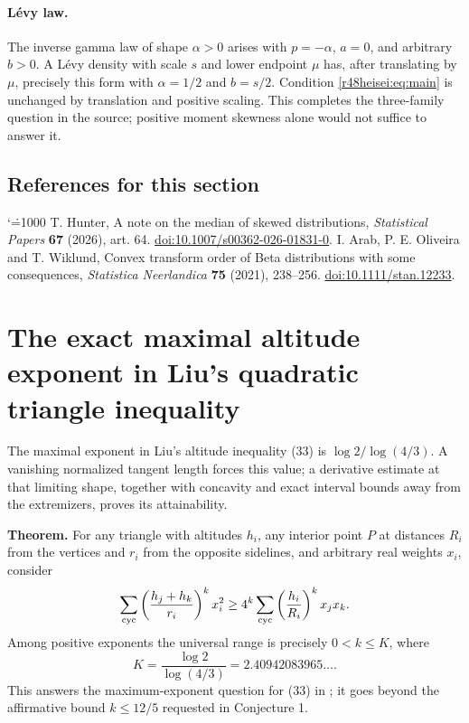 \documentclass[11pt,a4paper]{article}
\makeatletter
\numberwithin{equation}{section}
\theoremstyle{definition}
\theoremstyle{remark}
\newenvironment{sectionabstract}{\par\smallskip\begingroup\small\noindent}{\par\endgroup\medskip}
\renewenvironment{thebibliography}[1]
 {\subsection*{References for this section}\small
  \list{\@biblabel{\@arabic\c@enumiv}}
       {\settowidth\labelwidth{\@biblabel{#1}}\leftmargin\labelwidth
        \advance\leftmargin\labelsep\@openbib@code
        \usecounter{enumiv}\let\p@enumiv\@empty
        \renewcommand\theenumiv{\@arabic\c@enumiv}}
  \sloppy\clubpenalty4000\widowpenalty4000\sfcode`\.=1000\relax}
 {\def\@noitemerr{\@latex@warning{Empty bibliography}}\endlist}
\makeatother
\begin{document}
\paragraph{L\'evy law.} The inverse gamma law of shape $\alpha>0$ arises with $p=-\alpha$, $a=0$, and arbitrary $b>0$. A L\'evy density with scale $s$ and lower endpoint $\mu$ has, after translating by $\mu$, precisely this form with $\alpha=1/2$ and $b=s/2$. Condition \eqref{r48heisei:eq:main} is unchanged by translation and positive scaling. This completes the three-family question in the source; positive moment skewness alone would not suffice to answer it.

\begin{thebibliography}{9}
 T. Hunter, A note on the median of skewed distributions, \emph{Statistical Papers} \textbf{67} (2026), art. 64. \href{https://doi.org/10.1007/s00362-026-01831-0}{doi:10.1007/s00362-026-01831-0}.
 I. Arab, P. E. Oliveira and T. Wiklund, Convex transform order of Beta distributions with some consequences, \emph{Statistica Neerlandica} \textbf{75} (2021), 238--256. \href{https://doi.org/10.1111/stan.12233}{doi:10.1111/stan.12233}.
\end{thebibliography}

\par\endgroup

\begingroup
\newcommand{\cy}{\sum_{\rm cyc}}
\section{\texorpdfstring{The exact maximal altitude exponent in Liu's quadratic triangle inequality}{The exact maximal altitude exponent in Liu's quadratic triangle inequality}}\label{section:r48keio}
\par\medskip


\begin{sectionabstract}
The maximal exponent in Liu's altitude inequality (33) is $\log 2/\log(4/3)$. A vanishing normalized tangent length forces this value; a derivative estimate at that limiting shape, together with concavity and exact interval bounds away from the extremizers, proves its attainability.
\end{sectionabstract}
\textbf{Theorem.} For any triangle with altitudes $h_i$, any interior point $P$ at distances $R_i$ from the vertices and $r_i$ from the opposite sidelines, and arbitrary real weights $x_i$, consider
\begin{equation}
 \cy\left(\frac{h_j+h_k}{r_i}\right)^k x_i^2\ge
 4^k\cy\left(\frac{h_i}{R_i}\right)^k x_jx_k.\label{r48keio:alt}
\end{equation}
Among positive exponents the universal range is precisely $0<k\le K$, where
\[
 K=\frac{\log2}{\log(4/3)}=2.40942083965\ldots.
\]
This answers the maximum-exponent question for (33) in \cite[Remark 2]{r48keio:liu}; it goes beyond the affirmative bound $k\le12/5$ requested in Conjecture 1.
\end{document}
